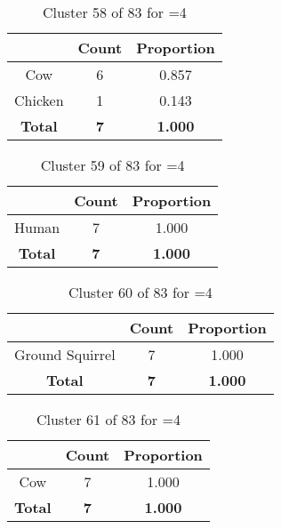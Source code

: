 \begin{table}[ht!]
\centering
\begin{tabular}{|c|c|c|}
\hline
\bf \Spec{} &\bf Count &\bf Proportion\\ \hline \hline
Cow & 6 & 0.857\\ \hline
Chicken & 1 & 0.143\\ \hline
\hline
\bf Total & \bf 7 & \bf 1.000\\ \hline
\end{tabular}
\label{tab:cluster:58:4}
\caption{Cluster 58 of 83 for \minneigh{}=4}
\end{table}

\begin{table}[ht!]
\centering
\begin{tabular}{|c|c|c|}
\hline
\bf \Spec{} &\bf Count &\bf Proportion\\ \hline \hline
Human & 7 & 1.000\\ \hline
\hline
\bf Total & \bf 7 & \bf 1.000\\ \hline
\end{tabular}
\label{tab:cluster:59:4}
\caption{Cluster 59 of 83 for \minneigh{}=4}
\end{table}

\clearpage
\begin{table}[ht!]
\centering
\begin{tabular}{|c|c|c|}
\hline
\bf \Spec{} &\bf Count &\bf Proportion\\ \hline \hline
Ground Squirrel & 7 & 1.000\\ \hline
\hline
\bf Total & \bf 7 & \bf 1.000\\ \hline
\end{tabular}
\label{tab:cluster:60:4}
\caption{Cluster 60 of 83 for \minneigh{}=4}
\end{table}

\begin{table}[ht!]
\centering
\begin{tabular}{|c|c|c|}
\hline
\bf \Spec{} &\bf Count &\bf Proportion\\ \hline \hline
Cow & 7 & 1.000\\ \hline
\hline
\bf Total & \bf 7 & \bf 1.000\\ \hline
\end{tabular}
\label{tab:cluster:61:4}
\caption{Cluster 61 of 83 for \minneigh{}=4}
\end{table}


